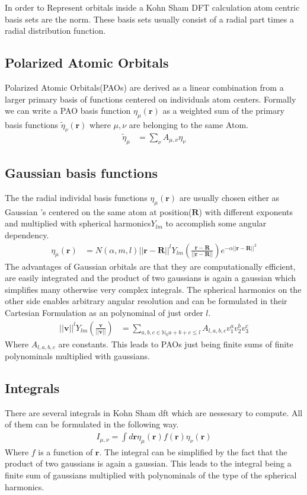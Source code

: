 In order to Represent orbitals inside a Kohn Sham DFT calculation atom centric basis sets are the norm.
These basis sets usually consist of a radial part times a radial distribution function.
\subsection{Polarized Atomic Orbitals}
Polarized Atomic Orbitals(PAOs) are derived as a linear combination from a larger primary basis of functions centered on individuals atom centers. Formally we can write a PAO basis function $\eta_{\mu}(\mathbf{r})$ as a weighted sum of the primary basis functions $\tilde\eta_\nu(\mathbf{r})$ where $\mu,\nu$ are belonging to the same Atom.
\begin{align}
    \tilde \eta_{\mu} &=\sum\limits_{\nu} A_{\mu,\nu} \eta_{\nu} 
\end{align}
\subsection{Gaussian basis functions}
The the radial individal basis functions $\eta_{\mu}(\mathbf{r})$ are usually chosen either as Gaussian
's centered on the same atom at position($\mathbf{R}$) with different exponents and multiplied with spherical harmonics$Y_{lm}$ to accomplish some angular dependency.
\begin{align}
    \eta_{\mu}(\mathbf{r}) &= N(\alpha,m,l) ||\mathbf{r}-\mathbf{R}||^l Y_{lm}(\frac{\mathbf{r}-\mathbf{R}}{||\mathbf{r}-\mathbf{R}||}) e^{-\alpha ||\mathbf{r}-\mathbf{R}||^2}
\end{align}
The advantages of Gaussian orbitals are that they are computationally efficient, are easily integrated and the product of two gaussians is again a gaussian which simplifies many otherwise very complex integrals.
The spherical harmonics on the other side enables arbitrary angular resolution and can be formulated in their Cartesian Formulation as an polynominal of just order $l$.
\begin{align}
    ||\mathbf{v}||^l Y_{lm}(\frac{\mathbf{v}}{||\mathbf{v}||}) &= \sum\limits_{a,b,c\in \mathbb{N}_0 a+b+c\leq l} A_{l,a,b,c} v_1^a v_2^b v_3^c
\end{align}
Where $A_{l,a,b,c}$ are constants. This leads to PAOs just being finite sums of finite polynominals multiplied with gaussians.

\subsection{Integrals}
There are several integrals in Kohn Sham dft which are nessesary to compute. All of them can be formulated in the following way.
\begin{align}
    I_{\mu,\nu} = \int d\mathbf{r} \eta_{\mu}(\mathbf{r}) f(\mathbf{r}) \eta_{\nu}(\mathbf{r})
\end{align}
Where $f$ is a function of $\mathbf{r}$. The integral can be simplified by the fact that the product of two gaussians is again a gaussian. This leads to the integral being a finite sum of gaussians multiplied with polynominals of the type of the spherical harmonics.

